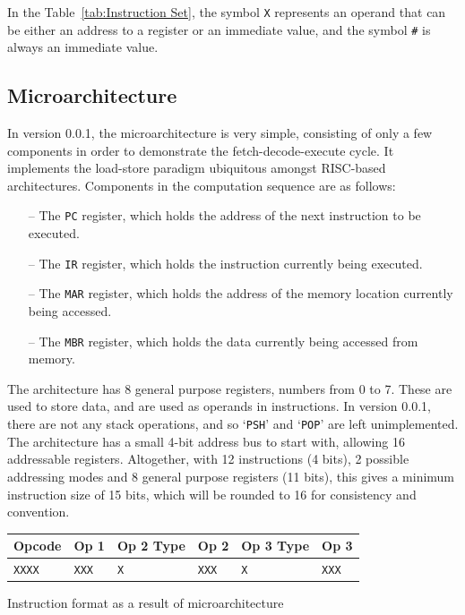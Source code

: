 \documentclass[a4paper,11pt]{article}
\makeatletter
\newenvironment{tablehere}
  {\def\@captype{table}}
  {}
\makeatother
\begin{document}
In the Table~\ref{tab:Instruction Set}, the symbol \texttt{X} represents an operand that can be either an address to a register or an immediate value, and the symbol \texttt{\#} is always an immediate value.

\subsection{Microarchitecture}
\label{subsec:Microarchitecture}

In version 0.0.1, the microarchitecture is very simple, consisting of only a few components in order to demonstrate the fetch-decode-execute cycle. It implements the load-store paradigm ubiquitous amongst RISC-based architectures. Components in the computation sequence are as follows:

\begin{itemize}
  \item[--] The \texttt{PC} register, which holds the address of the next instruction to be executed.
  \item[--] The \texttt{IR} register, which holds the instruction currently being executed.
  \item[--] The \texttt{MAR} register, which holds the address of the memory location currently being accessed.
  \item[--] The \texttt{MBR} register, which holds the data currently being accessed from memory.
\end{itemize}

The architecture has 8 general purpose registers, numbers from 0 to 7. These are used to store data, and are used as operands in instructions. In version 0.0.1, there are not any stack operations, and so `\texttt{PSH}' and  `\texttt{POP}' are left unimplemented. The architecture has a small 4-bit address bus to start with, allowing 16 addressable registers. Altogether, with 12 instructions (4 bits), 2 possible addressing modes and 8 general purpose registers (11 bits)\footnotemark, this gives a minimum instruction size of 15 bits, which will be rounded to 16 for consistency and convention.


\begin{tablehere}
  \centering
  \begin{tabular}{@{}llllll@{}}
    \toprule
    \textbf{Opcode} & \textbf{Op 1} & \textbf{Op 2 Type} & \textbf{Op 2} & \textbf{Op 3 Type} & \textbf{Op 3} \\
    \midrule
    \texttt{XXXX}   & \texttt{XXX}  & \texttt{X}         & \texttt{XXX}  & \texttt{X}         & \texttt{XXX}  \\
    \bottomrule
  \end{tabular}
  \label{tab:Instruction format as a result of microarchitecture}
  \caption{Instruction format as a result of microarchitecture}
\end{tablehere}
\end{document}
